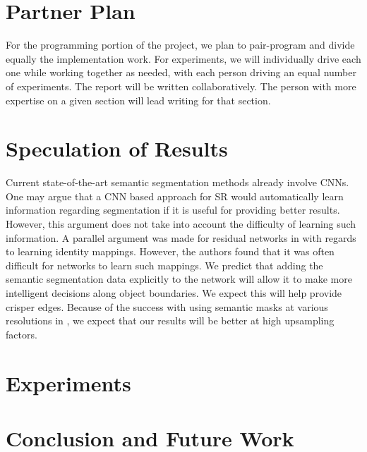 \documentclass[10pt,twocolumn,letterpaper]{article}
\begin{document}

\section{Partner Plan}
For the programming portion of the project, we plan to pair-program and
divide equally the implementation work. For experiments, we will individually
drive each one while working together as needed, with each person driving an
equal number of experiments. The report will be written collaboratively. The
person with more expertise on a given section will lead writing for that
section.


\section{Speculation of Results}
Current state-of-the-art semantic segmentation methods already involve CNNs.
One may argue that a CNN based approach for SR would automatically learn
information regarding segmentation if it is useful for providing better
results. However, this argument does not take into account the difficulty of
learning such information. A parallel argument was made for residual networks
in \cite{ResNet} with regards to learning identity mappings. However, the
authors found that it was often difficult for networks to learn such mappings.
We predict that adding the semantic segmentation data explicitly to the network
will allow it to make more intelligent decisions along object boundaries. We
expect this will help provide crisper edges. Because of the success with using
semantic masks at various resolutions in \cite{ImageSynthesis}, we expect that
our results will be better at high upsampling factors.

\section{Experiments}

\section{Conclusion and Future Work}

{\small


}
\end{document}
